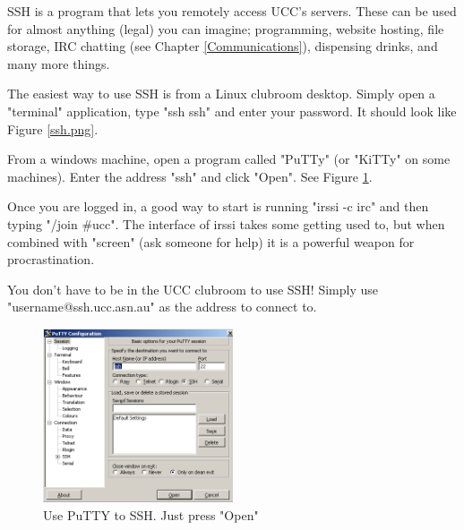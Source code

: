 \begin{mdframed}

SSH is a program that lets you remotely access UCC's servers. These can be used for almost anything (legal) you can imagine; programming, website hosting, file storage, IRC chatting (see Chapter \ref{Communications}), dispensing drinks, and many more things.

The easiest way to use SSH is from a Linux clubroom desktop. Simply open a "terminal" application, type "ssh ssh" and enter your password. It should look like Figure \ref{ssh.png}.

From a windows machine, open a program called "PuTTy" (or "KiTTy" on some machines). Enter the address "ssh" and click "Open". See Figure \ref{putty.png}.

Once you are logged in, a good way to start is running "irssi -c irc" and then typing "/join \#ucc". The interface of irssi takes some getting used to, but when combined with "screen" (ask someone for help) it is a powerful weapon for procrastination.

You don't have to be in the UCC clubroom to use SSH! Simply use "username@ssh.ucc.asn.au" as the address to connect to.

\end{mdframed}

\begin{mdframed}



\begin{figure}[H]
	\centering
	\includegraphics[width=0.5\textwidth]{figures/putty.png}
	\caption{Use PuTTY to SSH. Just press "Open"} 
	\label{putty.png}
\end{figure}

\end{mdframed}
